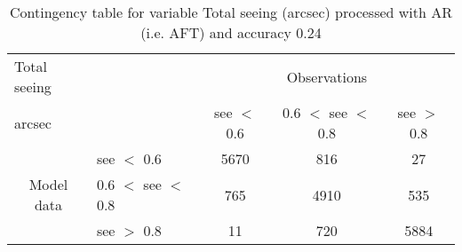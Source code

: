 \begin{table}[]
\begin{center}
\begin{tabular}{llccc}
\hline
{Total seeing}                                       &                                                    & \multicolumn{3}{c}{Observations}                 \\
{arcsec}                                       &                             & see $<$ 0.6   & 0.6 $<$ see $<$ 0.8 & see $>$ 0.8 \\
\hline
\multicolumn{1}{c}{\multirow{3}{*}{Model data}}  & see $<$ 0.6             & 5670                & 816                       & 27              \\
                                                 & 0.6  $<$ see $<$ 0.8 & 765                & 4910                       & 535              \\
                                                 & see $>$ 0.8             & 11                & 720                       & 5884              \\
\hline
\end{tabular}
\end{center}
\caption{Contingency table for variable Total seeing (arcsec) processed with AR (i.e. AFT) and accuracy 0.24}
\label{tab:contingencyseeAFT}
\end{table}

